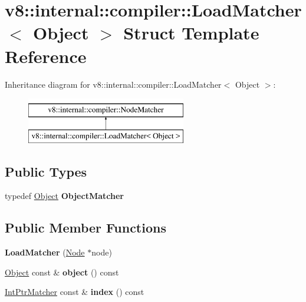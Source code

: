 \hypertarget{structv8_1_1internal_1_1compiler_1_1LoadMatcher}{}\section{v8\+:\+:internal\+:\+:compiler\+:\+:Load\+Matcher$<$ Object $>$ Struct Template Reference}
\label{structv8_1_1internal_1_1compiler_1_1LoadMatcher}
Inheritance diagram for v8\+:\+:internal\+:\+:compiler\+:\+:Load\+Matcher$<$ Object $>$\+:\begin{figure}[H]
\begin{center}
\leavevmode
\includegraphics[height=2.000000cm]{structv8_1_1internal_1_1compiler_1_1LoadMatcher}
\end{center}
\end{figure}
\subsection*{Public Types}
\begin{DoxyCompactItemize}
\item 
\mbox{\label{structv8_1_1internal_1_1compiler_1_1LoadMatcher_a10a4b7ab7a3abdca34529ae3d06aa36e}} 
typedef \mbox{\hyperlink{classv8_1_1internal_1_1Object}{Object}} {\bfseries Object\+Matcher}
\end{DoxyCompactItemize}
\subsection*{Public Member Functions}
\begin{DoxyCompactItemize}
\item 
\mbox{\label{structv8_1_1internal_1_1compiler_1_1LoadMatcher_a6d34070b4c5e21c21c0a884f28f5abe2}} 
{\bfseries Load\+Matcher} (\mbox{\hyperlink{classv8_1_1internal_1_1compiler_1_1Node}{Node}} $\ast$node)
\item 
\mbox{\label{structv8_1_1internal_1_1compiler_1_1LoadMatcher_a75cb657f8969c30e32757970feb3a3be}} 
\mbox{\hyperlink{classv8_1_1internal_1_1Object}{Object}} const  \& {\bfseries object} () const
\item 
\mbox{\label{structv8_1_1internal_1_1compiler_1_1LoadMatcher_ac6660c53310f43ce9a9bcae96b9766d5}} 
\mbox{\hyperlink{structv8_1_1internal_1_1compiler_1_1IntMatcher}{Int\+Ptr\+Matcher}} const  \& {\bfseries index} () const
\end{DoxyCompactItemize}


